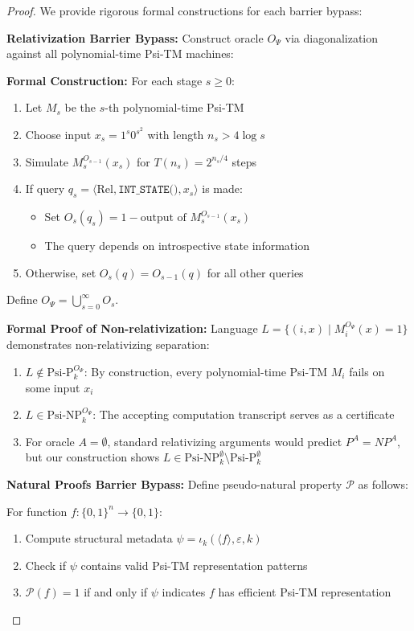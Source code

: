 \documentclass[11pt]{article}
\begin{document}
\begin{proof}
We provide rigorous formal constructions for each barrier bypass:

\textbf{Relativization Barrier Bypass:}
Construct oracle $O_\Psi$ via diagonalization against all polynomial-time Psi-TM machines:

\textbf{Formal Construction:}
For each stage $s \geq 0$:
\begin{enumerate}
\item Let $M_s$ be the $s$-th polynomial-time Psi-TM
\item Choose input $x_s = 1^s 0^{s^2}$ with length $n_s > 4 \log s$
\item Simulate $M_s^{O_{s-1}}(x_s)$ for $T(n_s) = 2^{n_s/4}$ steps
\item If query $q_s = \langle \text{Rel}, \texttt{INT\_STATE()}, x_s \rangle$ is made:
   \begin{itemize}
   \item Set $O_s(q_s) = 1 - \text{output of } M_s^{O_{s-1}}(x_s)$
   \item The query depends on introspective state information
   \end{itemize}
\item Otherwise, set $O_s(q) = O_{s-1}(q)$ for all other queries
\end{enumerate}
Define $O_\Psi = \bigcup_{s=0}^{\infty} O_s$.

\textbf{Formal Proof of Non-relativization:}
Language $L = \{(i, x) \mid M_i^{O_\Psi}(x) = 1\}$ demonstrates non-relativizing separation:

\begin{enumerate}
\item $L \notin \text{Psi-P}^{O_\Psi}_k$: By construction, every polynomial-time Psi-TM $M_i$ fails on some input $x_i$
\item $L \in \text{Psi-NP}^{O_\Psi}_k$: The accepting computation transcript serves as a certificate
\item For oracle $A = \emptyset$, standard relativizing arguments would predict $P^A = NP^A$, but our construction shows $L \in \text{Psi-NP}^{\emptyset}_k \setminus \text{Psi-P}^{\emptyset}_k$
\end{enumerate}

\textbf{Natural Proofs Barrier Bypass:}
Define pseudo-natural property $\mathcal{P}$ as follows:

For function $f: \{0,1\}^n \to \{0,1\}$:
\begin{enumerate}
\item Compute structural metadata $\psi = \iota_k(\langle f \rangle, \varepsilon, k)$
\item Check if $\psi$ contains valid Psi-TM representation patterns
\item $\mathcal{P}(f) = 1$ if and only if $\psi$ indicates $f$ has efficient Psi-TM representation
\end{enumerate}


\end{proof}
\end{document}
